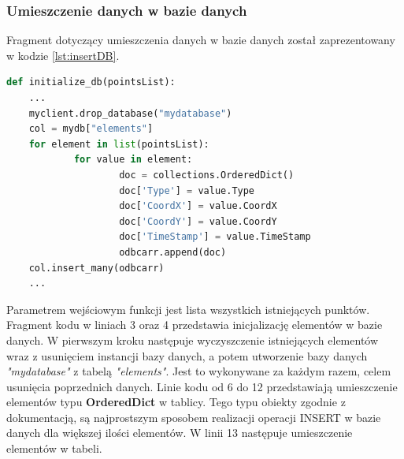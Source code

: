 \subsubsection{Umieszczenie danych w bazie danych}
\label{ssec:insertDB}
Fragment dotyczący umieszczenia danych w bazie danych został zaprezentowany w kodzie \ref{lst:insertDB}. 
\begin{lstlisting}[language=Python, caption=Umieszczenie danych w bazie danych, label={lst:insertDB}]
def initialize_db(pointsList):
    ...
    myclient.drop_database("mydatabase")
    col = mydb["elements"]
    for element in list(pointsList):
            for value in element:
                    doc = collections.OrderedDict()
                    doc['Type'] = value.Type
                    doc['CoordX'] = value.CoordX
                    doc['CoordY'] = value.CoordY
                    doc['TimeStamp'] = value.TimeStamp
                    odbcarr.append(doc)
    col.insert_many(odbcarr)
    ...
\end{lstlisting}
Parametrem wejściowym funkcji jest lista wszystkich istniejących punktów. Fragment kodu w liniach 3 oraz 4 przedstawia inicjalizację elementów w bazie danych. W pierwszym kroku następuje wyczyszczenie istniejących elementów wraz z usunięciem instancji bazy danych, a potem utworzenie bazy danych \emph{"mydatabase"} z tabelą \emph{"elements"}. Jest to wykonywane za każdym razem, celem usunięcia poprzednich danych. Linie kodu od 6 do 12 przedstawiają umieszczenie elementów typu \textbf{OrderedDict} w tablicy. Tego typu obiekty zgodnie z dokumentacją, są najprostszym sposobem realizacji operacji INSERT w bazie danych dla większej ilości elementów. W linii 13 następuje umieszczenie elementów w tabeli.
